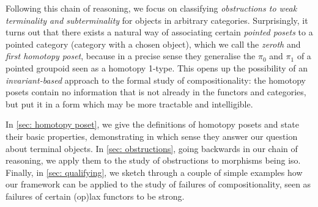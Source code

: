 Following this chain of reasoning, we focus on classifying \emph{obstructions to weak terminality and subterminality} for objects in arbitrary categories.
Surprisingly, it turns out that there exists a natural way of associating certain \emph{pointed posets} to a pointed category (category with a chosen object), which we call the \emph{zeroth} and \emph{first homotopy poset}, because in a precise sense they generalise the $\pi_0$ and $\pi_1$ of a pointed groupoid seen as a homotopy 1-type.
This opens up the possibility of an \emph{invariant-based} approach to the formal study of compositionality: the homotopy posets contain no information that is not already in the functors and categories, but put it in a form which may be more tractable and intelligible.

In \autoref{sec: homotopy poset}, we give the definitions of homotopy posets and state their basic properties, demonstrating in which sense they answer our question about terminal objects.
In \autoref{sec: obstructions}, going backwards in our chain of reasoning, we apply them to the study of obstructions to morphisms being iso.
Finally, in \autoref{sec: qualifying}, we sketch through a couple of simple examples how our framework can be applied to the study of failures of compositionality, seen as failures of certain (op)lax functors to be strong.